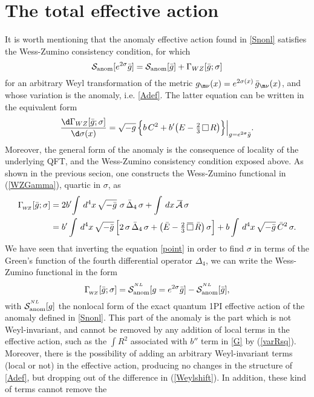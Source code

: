 \documentclass[a4paper,11pt,openright,twoside]{book}
\let\n=\nu      \let\x=\xi     \let\p=\pi      \let\r=\rho
\let\s=\sigma  \let\t=\tau     \let\u=\upsilon \let\f=\phi
\let\G=\Gamma  \let\D=\Delta \let\Q=\Theta  \let\L=\Lambda
\def\nbox#1#2{\vcenter{\hrule \hbox{\vrule height#2in
			\kern#1in \vrule} \hrule}}
\def\sq{\,\raise.5pt\hbox{$\nbox{.09}{.09}$}\,}
\def\sqb{\,\raise.5pt\hbox{$\overline{\nbox{.09}{.09}}$}\,}
\numberwithin{equation}{section}
\begin{document}
{{{%
\section{The total effective action}
\label{Sec:AnomAct}
It is worth mentioning that the anomaly effective action found in \eqref{Snonl} satisfies the Wess-Zumino consistency condition, for which 
\begin{equation}
	\mathcal{S}_{\rm anom}[e^{2\s}\bar g] = \mathcal{S}_{\rm anom}[\bar g] + \G_{WZ}[\bar g;\s]
	\label{WZGamma}
\end{equation} 
for an arbitrary Weyl transformation of the metric $g_{\m\n}(x) = e^{2\s (x)} \,\bar g_{\m\n}(x)$, and whose variation is the anomaly, i.e. \eqref{Adef}. The latter equation can be written in the  equivalent form
\begin{equation}
	\frac{\d \G_{WZ}[\bar g;\s]}{\d \s (x)}=\sqrt{-g}\, \Big\{ b\, C^2 + b' \big(E - \tfrac{2}{3}\sq R\big) \Big\}\Big\vert_{g = e^{2\s}\bar g}.
	\label{traceiden}
\end{equation}
Moreover, the general form of the anomaly is the consequence of locality of the underlying QFT,  and the Wess-Zumino consistency condition exposed above. As shown in the previous secion, one constructs the Wess-Zumino functional in (\ref{WZGamma}), quartic in $\sigma$, as 
\begin{align}
	\G_{_{\!W\!Z}}[\bar g;\s] &= 2 b'\! \int\,d^4x\,\sqrt{-\bar g}\ \s\,\bar\D_4\,\s + \int\,dx\ \overline{\!\mathcal{A}} \, \s\notag\\
	& = b' \int\,d^4x\,\sqrt{-\bar g}\,\Big[2\,\s\,\bar\Delta_4\,\s + \left(\bar E - \tfrac{2}{3} \sqb \bar R\right)\s \Big]
	+ b \int\,d^4x\,\sqrt{-\bar g}\, \bar C^2\,\s.
	\label{WZfour}
\end{align}
We have seen that inverting the equation \eqref{point} in order to find $\s$ in terms of the Green's function of the fourth differential operator $\Delta_4$, we can write the Wess-Zumino functional in the form
\begin{equation}
	\G_{_{\!W\!Z}}[\bar g;\s] = \mathcal{S}_{\rm anom}^{^{NL}}[g=e^{2\s}\bar g] - \mathcal{S}_{\rm anom}^{^{NL}}[\bar g],
	\label{Weylshift}
\end{equation}
with $\mathcal{S}_{\rm anom}^{^{NL}}[g]$ the nonlocal form of the exact quantum 1PI effective action of the anomaly defined in \eqref{Snonl}. This part of the anomaly is the part which is not Weyl-invariant, and cannot be removed by any addition of local terms in the effective action, such as the $\int R^2$ associated with $b''$ term in \eqref{G} by (\ref{varRsq}). Moreover, there is the possibility of adding an arbitrary Weyl-invariant terms (local or not) in the effective action, producing no changes in the structure of \eqref{Adef}, but dropping out of the difference in (\ref{Weylshift}). In addition, these kind of terms cannot remove the
}}}
\end{document}
